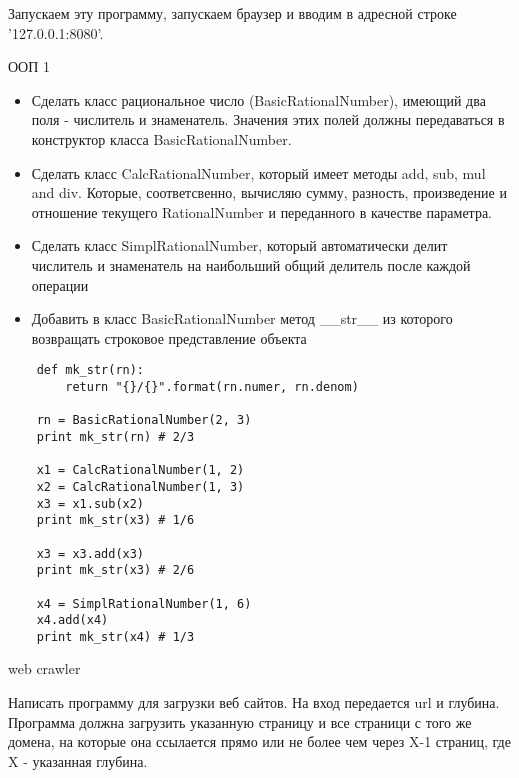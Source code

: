 \documentclass{article}
\begin{document}
Запускаем эту программу, запускаем браузер и вводим в адресной строке '127.0.0.1:8080'.

\newpage

\begin{center} ООП 1 \end{center}
\begin{itemize}
    \item Сделать класс рациональное число (BasicRationalNumber),
        имеющий два поля - числитель и знаменатель. Значения этих полей
        должны передаваться в конструктор класса BasicRationalNumber.
    \item Сделать класс CalcRationalNumber, который имеет методы add,
        sub, mul and div. Которые, соответсвенно, вычисляю сумму, разность,
        произведение и отношение текущего RationalNumber и переданного в качестве
        параметра.
    \item Сделать класс SimplRationalNumber, который автоматически делит
        числитель и знаменатель на наибольший общий делитель после каждой операции
    \item Добавить в класс BasicRationalNumber метод \_\_str\_\_ из которого возвращать
        строковое представление объекта
\end{itemize}

\begin{lstlisting}
    def mk_str(rn):
        return "{}/{}".format(rn.numer, rn.denom)

    rn = BasicRationalNumber(2, 3)
    print mk_str(rn) # 2/3

    x1 = CalcRationalNumber(1, 2)
    x2 = CalcRationalNumber(1, 3)
    x3 = x1.sub(x2)
    print mk_str(x3) # 1/6

    x3 = x3.add(x3)
    print mk_str(x3) # 2/6

    x4 = SimplRationalNumber(1, 6)
    x4.add(x4)
    print mk_str(x4) # 1/3
\end{lstlisting}
\newpage

\begin{center} web crawler \end{center}
Написать программу для загрузки веб сайтов. На вход передается url и глубина.
Программа должна загрузить указанную страницу и все страници с того же домена,
на которые она ссылается прямо или не более чем через X-1 страниц, где X -
указанная глубина.
\newpage
\end{document}
